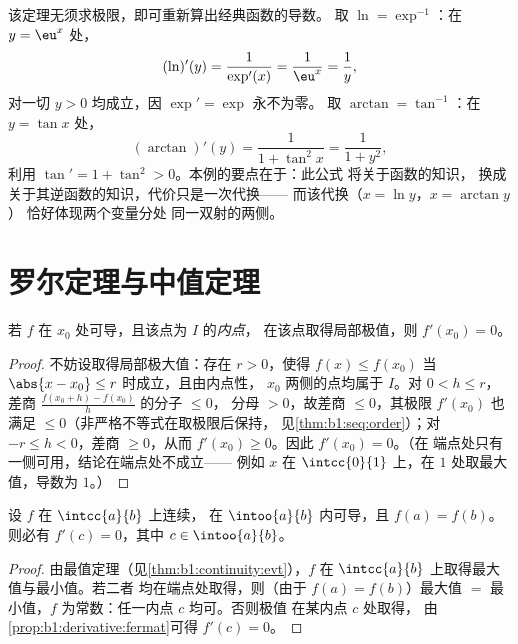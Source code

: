 \begin{example}[两次求逆函数的导数]\label{ex:b1:derivative:inverseaction}
该定理无须求极限，即可重新算出经典函数的导数。
取 $\ln = \exp^{-1}$：在 $y = \eu^x$ 处，
\[
(\ln)'(y) = \frac{1}{\exp'(x)} = \frac{1}{\eu^{x}} = \frac1y ,
\]
对一切 $y > 0$ 均成立，因 $\exp' = \exp$ 永不为零。
取 $\arctan = \tan^{-1}$：在 $y = \tan x$ 处，
\[
(\arctan)'(y) = \frac{1}{1 + \tan^2 x} = \frac{1}{1 + y^2} ,
\]
利用 $\tan' = 1 + \tan^2 > 0$。本例的要点在于：此公式
将关于函数的知识，
换成关于其逆函数的知识，代价只是一次代换——
而该代换（$x = \ln y$，$x = \arctan y$）
恰好体现两个变量分处
同一双射的两侧。
\end{example}

\section{罗尔定理与中值定理}

\begin{proposition}[内点极值]\label{prop:b1:derivative:fermat}
若 $f$ 在 $x_0$ 处可导，且该点为 $I$ 的\emph{内点}，
在该点取得局部极值，则 $f'(x_0) = 0$。
\end{proposition}

\begin{proof}
不妨设取得局部极大值：存在 $r > 0$，使得 $f(x) \leq f(x_0)$
当 $\abs{x - x_0} \leq r$ 时成立，且由内点性，
$x_0$ 两侧的点均属于 $I$。对 $0 < h \leq r$，
差商 $\frac{f(x_0 + h) - f(x_0)}{h}$ 的分子 $\leq 0$，
分母 $> 0$，故差商 $\leq 0$，其极限 $f'(x_0)$
也满足 $\leq 0$（非严格不等式在取极限后保持，
见\cref{thm:b1:seq:order}）；对 $-r \leq h < 0$，差商
$\geq 0$，从而 $f'(x_0) \geq 0$。因此 $f'(x_0) = 0$。（在
端点处只有一侧可用，结论在端点处不成立——
例如 $x$ 在 $\intcc{0}{1}$ 上，在 $1$ 处取最大值，导数为
$1$。）
\end{proof}

\begin{theorem}[罗尔定理]\label{thm:b1:derivative:rolle}
设 $f$ 在 $\intcc{a}{b}$ 上连续，
在 $\intoo{a}{b}$ 内可导，且 $f(a) = f(b)$。则必有 $f'(c) = 0$，其中 $c \in
\intoo{a}{b}$。
\end{theorem}

\begin{proof}
由最值定理（见\cref{thm:b1:continuity:evt}），$f$
在 $\intcc{a}{b}$ 上取得最大值与最小值。若二者
均在端点处取得，则（由于 $f(a) = f(b)$）最大值 $=$ 最小值，$f$
为常数：任一内点 $c$ 均可。否则极值
在某内点 $c$ 处取得，
由\cref{prop:b1:derivative:fermat}可得 $f'(c) = 0$。
\end{proof}

